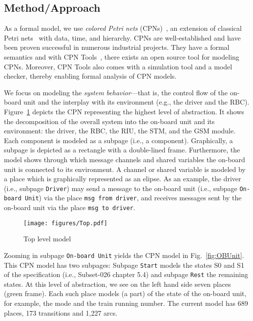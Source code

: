 \subsection{Method/Approach}

As a formal model, we use \textit{colored Petri nets} (CPNs)~\cite{CPN-book}, an extension of classical Petri nets~\cite{PNbook} with data, time, and hierarchy. CPNs are well-established and have been proven successful in numerous industrial projects. They have a formal semantics and with CPN Tools~\cite{Westergaard2013apn}, there exists an open source tool for modeling CPNs. Moreover, CPN Tools also comes with a simulation tool and a model checker, thereby enabling formal analysis of CPN models. 

We focus on modeling the \textit{system behavior}---that is, the control flow of the on-board unit and the interplay with its environment (e.g., the driver and the RBC). Figure~\ref{fig:Top} depicts the CPN representing the highest level of abstraction. It shows the decomposition of the overall system into the on-board unit and its environment: the driver, the RBC, the RIU, the STM, and the GSM module. Each component is modeled as a subpage (i.e., a component). Graphically, a subpage is depicted as a rectangle with a double-lined frame. Furthermore, the model shows through which message channels and shared variables the on-board unit is connected to its environment. A channel or shared variable is modeled by a place which is graphically represented as an elipse. As an example, the driver (i.e., subpage \texttt{Driver}) may send a message to the on-board unit (i.e., subpage \texttt{On-board Unit}) via the place \texttt{msg from driver}, and receives messages sent by the on-board unit via the place \texttt{msg to driver}.

\begin{figure}[tb]
	\centering
		\texttt{[image: figures/Top.pdf]}
	\caption{Top level model}
	\label{fig:Top}
\end{figure}

Zooming in subpage \texttt{On-board Unit} yields the CPN model in Fig.~\ref{fig:OBUnit}. This CPN model has two subpages: Subpage \texttt{Start} models the states S0 and S1 of the specification (i.e., Subset-026 chapter 5.4) and subpage \texttt{Rest} the remaining states. At this level of abstraction, we see on the left hand side seven places (green frame). Each such place models (a part) of the state of the on-board unit, for example, the mode and the train running number. The current model has 689 places, 173 transitions and 1,227 arcs.

